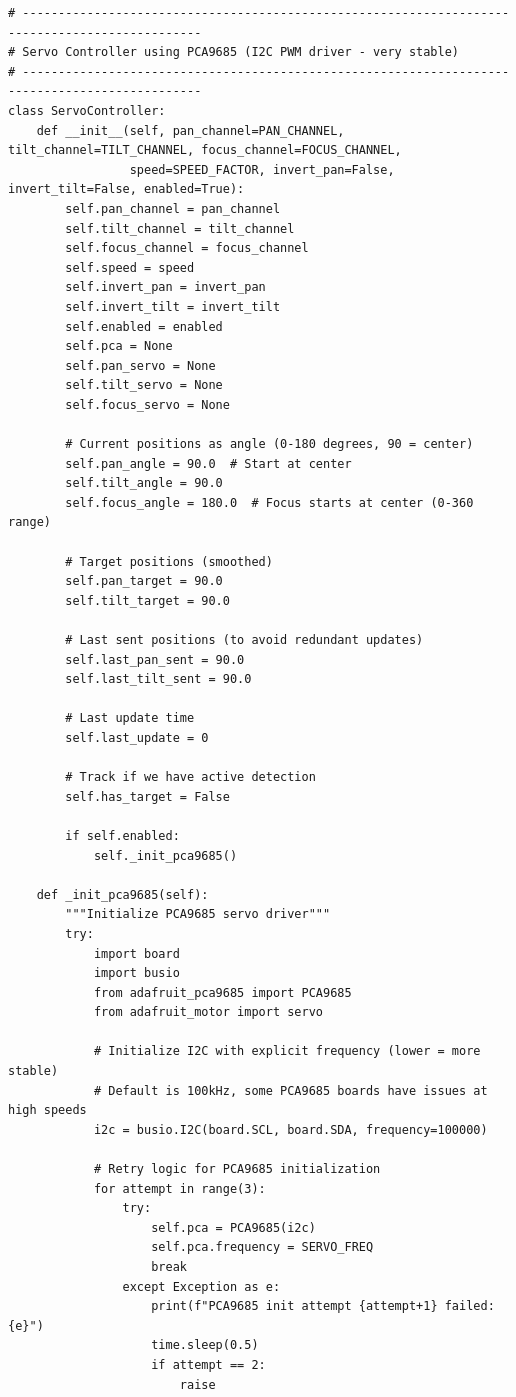 \documentclass[11pt,a4paper]{article}
\begin{document}
\begin{lstlisting}
# -----------------------------------------------------------------------------------------------
# Servo Controller using PCA9685 (I2C PWM driver - very stable)
# -----------------------------------------------------------------------------------------------
class ServoController:
    def __init__(self, pan_channel=PAN_CHANNEL, tilt_channel=TILT_CHANNEL, focus_channel=FOCUS_CHANNEL,
                 speed=SPEED_FACTOR, invert_pan=False, invert_tilt=False, enabled=True):
        self.pan_channel = pan_channel
        self.tilt_channel = tilt_channel
        self.focus_channel = focus_channel
        self.speed = speed
        self.invert_pan = invert_pan
        self.invert_tilt = invert_tilt
        self.enabled = enabled
        self.pca = None
        self.pan_servo = None
        self.tilt_servo = None
        self.focus_servo = None
        
        # Current positions as angle (0-180 degrees, 90 = center)
        self.pan_angle = 90.0  # Start at center
        self.tilt_angle = 90.0
        self.focus_angle = 180.0  # Focus starts at center (0-360 range)
        
        # Target positions (smoothed)
        self.pan_target = 90.0
        self.tilt_target = 90.0
        
        # Last sent positions (to avoid redundant updates)
        self.last_pan_sent = 90.0
        self.last_tilt_sent = 90.0
        
        # Last update time
        self.last_update = 0
        
        # Track if we have active detection
        self.has_target = False
        
        if self.enabled:
            self._init_pca9685()
    
    def _init_pca9685(self):
        """Initialize PCA9685 servo driver"""
        try:
            import board
            import busio
            from adafruit_pca9685 import PCA9685
            from adafruit_motor import servo
            
            # Initialize I2C with explicit frequency (lower = more stable)
            # Default is 100kHz, some PCA9685 boards have issues at high speeds
            i2c = busio.I2C(board.SCL, board.SDA, frequency=100000)
            
            # Retry logic for PCA9685 initialization
            for attempt in range(3):
                try:
                    self.pca = PCA9685(i2c)
                    self.pca.frequency = SERVO_FREQ
                    break
                except Exception as e:
                    print(f"PCA9685 init attempt {attempt+1} failed: {e}")
                    time.sleep(0.5)
                    if attempt == 2:
                        raise
            

\end{lstlisting}
\end{document}
